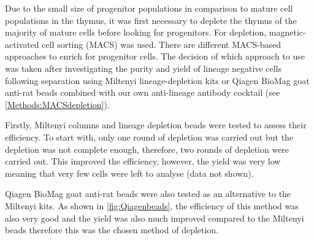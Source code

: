 
Due to the small size of progenitor populations in comparison to mature cell populations in the thymus, it was first necessary to deplete the thymus of the majority of mature cells before looking for progenitors.
For depletion, magnetic-activated cell sorting (MACS) was used.
There are different MACS-based approaches to enrich for progenitor cells.
The decision of which approach to use was taken after investigating the purity and yield of lineage negative cells following separation using Miltenyi lineage-depletion kits or Qiagen BioMag goat anti-rat beads combined with our own anti-lineage antibody cocktail (see \cref{Methods:MACSdepletion}).


Firstly, Miltenyi columns and lineage depletion beads were tested to assess their efficiency.
To start with, only one round of depletion was carried out but the depletion was not complete enough, therefore, two rounds of depletion were carried out.
This improved the efficiency, however, the yield was very low meaning that very few cells were left to analyse (data not shown).

Qiagen BioMag goat anti-rat beads were also tested as an alternative to the Miltenyi kits. 
As shown in \cref{fig:Qiagenbeads}, the efficiency of this method was also very good and the yield was also much improved compared to the Miltenyi beads therefore this was the chosen method of depletion.

